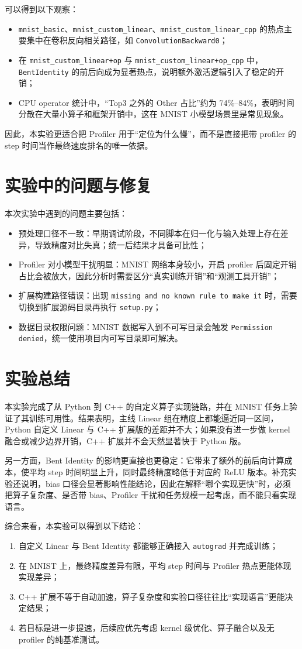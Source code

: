 \documentclass{article}
\begin{document}
可以得到以下观察：
\begin{itemize}
    \item \texttt{mnist\_basic}、\texttt{mnist\_custom\_linear}、\texttt{mnist\_custom\_linear\_cpp} 的热点主要集中在卷积反向相关路径，如 \texttt{ConvolutionBackward0}；
    \item 在 \texttt{mnist\_custom\_linear+op} 与 \texttt{mnist\_custom\_linear+op\_cpp} 中，\texttt{BentIdentity} 的前后向成为显著热点，说明额外激活逻辑引入了稳定的开销；
    \item CPU operator 统计中，“Top3 之外的 Other 占比”约为 74\%--84\%，表明时间分散在大量小算子和框架开销中，这在 MNIST 小模型场景里是常见现象。
\end{itemize}

因此，本实验更适合把 Profiler 用于“定位为什么慢”，而不是直接把带 profiler 的 step 时间当作最终速度排名的唯一依据。

\section{实验中的问题与修复}
本次实验中遇到的问题主要包括：
\begin{itemize}
    \item 预处理口径不一致：早期调试阶段，不同脚本在归一化与输入处理上存在差异，导致精度对比失真；统一后结果才具备可比性；
    \item Profiler 对小模型干扰明显：MNIST 网络本身较小，开启 profiler 后固定开销占比会被放大，因此分析时需要区分“真实训练开销”和“观测工具开销”；
    \item 扩展构建路径错误：出现 \texttt{missing and no known rule to make it} 时，需要切换到扩展源码目录再执行 \texttt{setup.py}；
    \item 数据目录权限问题：MNIST 数据写入到不可写目录会触发 \texttt{Permission denied}，统一使用项目内可写目录即可解决。
\end{itemize}

\section{实验总结}
本实验完成了从 Python 到 C++ 的自定义算子实现链路，并在 MNIST 任务上验证了其训练可用性。结果表明，主线 Linear 组在精度上都能逼近同一区间，Python 自定义 Linear 与 C++ 扩展版的差距并不大；如果没有进一步做 kernel 融合或减少边界开销，C++ 扩展并不会天然显著快于 Python 版。

另一方面，Bent Identity 的影响更直接也更稳定：它带来了额外的前后向计算成本，使平均 step 时间明显上升，同时最终精度略低于对应的 ReLU 版本。补充实验还说明，bias 口径会显著影响性能结论，因此在解释“哪个实现更快”时，必须把算子复杂度、是否带 bias、Profiler 干扰和任务规模一起考虑，而不能只看实现语言。

综合来看，本实验可以得到以下结论：
\begin{enumerate}
    \item 自定义 Linear 与 Bent Identity 都能够正确接入 \texttt{autograd} 并完成训练；
    \item 在 MNIST 上，最终精度差异有限，平均 step 时间与 Profiler 热点更能体现实现差异；
    \item C++ 扩展不等于自动加速，算子复杂度和实验口径往往比“实现语言”更能决定结果；
    \item 若目标是进一步提速，后续应优先考虑 kernel 级优化、算子融合以及无 profiler 的纯基准测试。
\end{enumerate}
\end{document}
